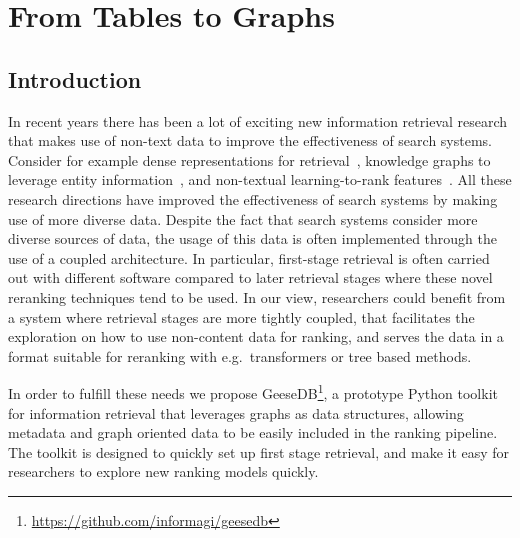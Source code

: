 \chapter{From Tables to Graphs}
\section{Introduction}
In recent years there has been a lot of exciting new information retrieval research that makes use of non-text data to improve the effectiveness of search systems. Consider for example dense representations for retrieval~\cite{dense-retrieval-1, dense-retrieval-2, dense-retrieval-3}, knowledge graphs to leverage entity information~\cite{entity-1, entity-2, entity-3}, and non-textual learning-to-rank features~\cite{ltr-1, ltr-2}. All these research directions have improved the effectiveness of search systems by making use of more diverse data. Despite the fact that search systems consider more diverse sources of data, the usage of this data is often implemented through the use of a coupled architecture. In particular, first-stage retrieval is often carried out with different software compared to later retrieval stages where these novel reranking techniques tend to be used. In our view, researchers could benefit from a system where retrieval stages are more tightly coupled, that facilitates the exploration on how to use non-content data for ranking, and serves the data in a format suitable for reranking with e.g.\ transformers or tree based methods.

In order to fulfill these needs we propose GeeseDB\footnote{\url{https://github.com/informagi/geesedb}}, a prototype Python toolkit for information retrieval that leverages graphs as data structures, allowing metadata and graph oriented data to be easily included in the ranking pipeline. The toolkit is designed to quickly set up first stage retrieval, and make it easy for researchers to explore new ranking models quickly.  

